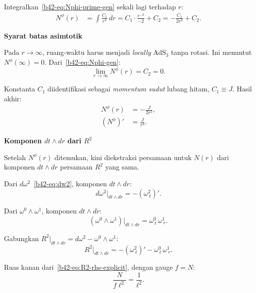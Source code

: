 Integralkan~\eqref{b42-eq:Nphi-prime-gen} sekali lagi terhadap $r$:
\begin{align}
    N^\phi(r) &= \int\frac{C_1}{r^3}\,dr = C_1\cdot\frac{r^{-2}}{-2} + C_2 = -\frac{C_1}{2r^2} + C_2. \label{b42-eq:Nphi-gen}
\end{align}

\vspace{0.5em}
\noindent \textbf{Syarat batas asimtotik}

Pada $r \to \infty$, ruang-waktu harus menjadi \emph{locally} AdS$_3$ tanpa rotasi. Ini menuntut $N^\phi(\infty) = 0$. Dari~\eqref{b42-eq:Nphi-gen}:
\begin{equation}
    \lim_{r\to\infty}N^\phi(r) = C_2 = 0.
\end{equation}

Konstanta $C_1$ diidentifikasi sebagai \emph{momentum sudut} lubang hitam, $C_1 \equiv J$. Hasil akhir:
\begin{align}
    N^\phi(r) &= -\frac{J}{2r^2}, \label{b42-eq:Nphi-result}\\[6pt]
    (N^\phi)' &= \frac{J}{r^3}. \label{b42-eq:Nphi-prime-result}
\end{align}

\vspace{0.5em}
\noindent \textbf{Komponen $dt \wedge dr$ dari $R^2$}

Setelah $N^\phi(r)$ ditemukan, kini diekstraksi persamaan untuk $N(r)$ dari komponen $dt \wedge dr$ persamaan $R^2$ yang sama.

\noindent Dari $d\omega^2$~\eqref{b42-eq:dw2}, komponen $dt \wedge dr$:
\begin{equation}
    d\omega^2\big|_{dt \wedge dr} = -(\omega^2_{\ t})'. \label{b42-eq:dw2-tr}
\end{equation}

\noindent Dari $\omega^0 \wedge \omega^1$, komponen $dt \wedge dr$:
\begin{equation}
    (\omega^0 \wedge \omega^1)\big|_{dt \wedge dr} = \omega^0_{\ t}\,\omega^1_{\ r}. \label{b42-eq:w0w1-tr}
\end{equation}

\noindent Gabungkan $R^2\big|_{dt \wedge dr} = d\omega^2 - \omega^0 \wedge \omega^1$:
\begin{equation}
    R^2\big|_{dt \wedge dr} = -(\omega^2_{\ t})' - \omega^0_{\ t}\,\omega^1_{\ r}. \label{b42-eq:R2-tr-lhs}
\end{equation}

Ruas kanan dari~\eqref{b42-eq:R2-rhs-explicit}, dengan gauge $f = N$:
\begin{equation}
    \frac{N}{f\ell^2} = \frac{1}{\ell^2}. \label{b42-eq:R2-tr-rhs}
\end{equation}

